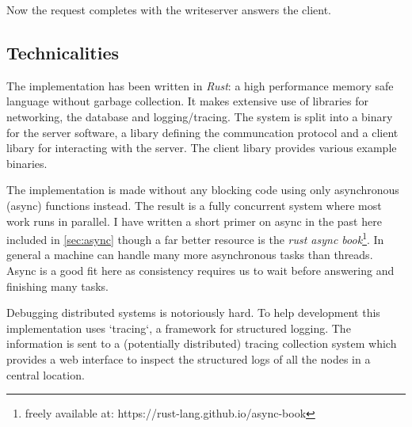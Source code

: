Now the request completes with the writeserver answers the client.

\subsection{Technicalities}
The implementation has been written in \textit{Rust}: a high performance memory safe language without garbage collection. It makes extensive use of libraries for networking, the database and logging/tracing. The system is split into a binary for the server software, a libary defining the communcation protocol and a client libary for interacting with the server. The client libary provides various example binaries.

The implementation is made without any blocking code using only asynchronous (async) functions instead. The result is a fully concurrent system where most work runs in parallel. I have written a short primer on async in the past here included in \cref{sec:async} though a far better resource is the \textit{rust async book}\footnote{freely available at: https://rust-lang.github.io/async-book}. In general a machine can handle many more asynchronous tasks than threads. Async is a good fit here as consistency requires us to wait before answering and finishing many tasks.

Debugging distributed systems is notoriously hard. To help development this implementation uses `tracing`, a framework for structured logging. The information is sent to a (potentially distributed) tracing collection system which provides a web interface to inspect the structured logs of all the nodes in a central location.
